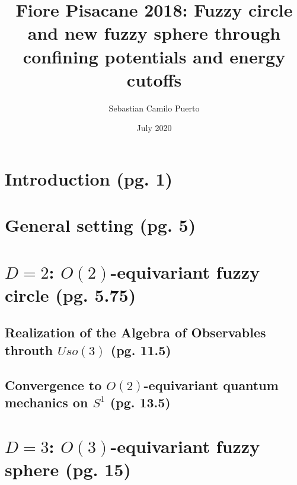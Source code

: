 \documentclass{article}
\title{Fiore Pisacane 2018: Fuzzy circle and new fuzzy sphere through confining potentials and energy cutoffs}
\author{Sebastian Camilo Puerto}
\date{July 2020}
\begin{document}
\maketitle

\tableofcontents

\section{Introduction (pg. 1)}

\section{General setting (pg. 5)}

\section{$D=2$: $O(2)$-equivariant fuzzy circle (pg. 5.75)}

\subsection{Realization of the Algebra of Observables throuth $Uso(3)$ (pg. 11.5)}

\subsection{Convergence to $O(2)$-equivariant quantum mechanics on $S^1$ (pg. 13.5)}

\section{$D=3$: $O(3)$-equivariant fuzzy sphere (pg. 15)}
\end{document}
